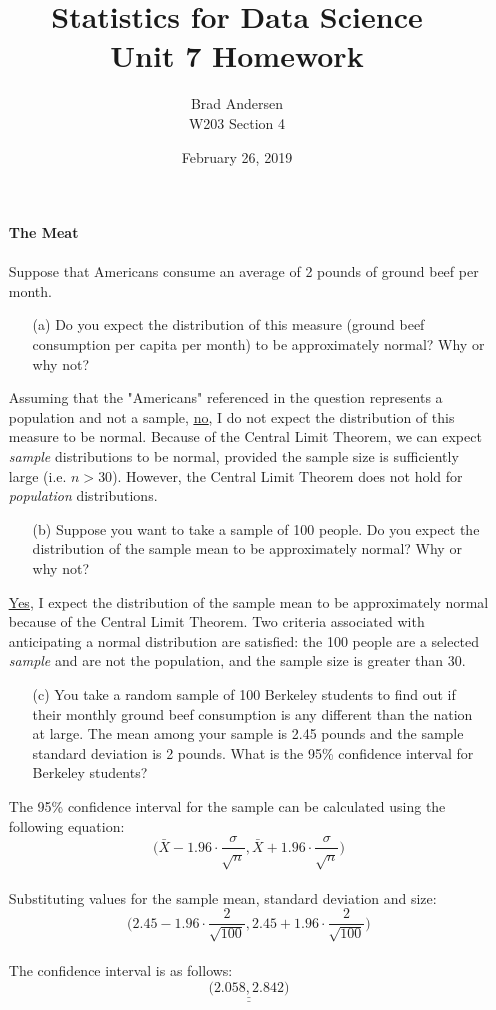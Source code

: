 \documentclass[12pt,a4paper]{article}
\title{Statistics for Data Science \\
    Unit 7 Homework}
\author{Brad Andersen \\
    W203 Section 4}
\date{February 26, 2019}
\numberwithin{equation}{subsection}
\def\doubleunderline#1{\underline{\underline{#1}}}
\begin{document}
\maketitle

\begin{enumerate}

\item[]\textbf{The Meat} \\ \\
Suppose that Americans consume an average of 2 pounds of ground beef per month.
\begin{enumerate}
\item[(a)]
Do you expect the distribution of this measure (ground beef consumption per capita per month) to be approximately normal? Why or why not?
\end{enumerate}
Assuming that the "Americans" referenced in the question represents a population and not a sample, \doubleunderline{no}, I do not expect the distribution of this measure to be normal.  Because of the Central Limit Theorem, we can expect \textit{sample} distributions to be normal, provided the sample size is sufficiently large (i.e. $n > 30$).  However, the Central Limit Theorem does not hold for \textit{population} distributions.
\begin{enumerate}
\item[(b)]
Suppose you want to take a sample of 100 people. Do you expect the distribution of the sample mean to be approximately normal? Why or why not?
\end{enumerate}
\doubleunderline{Yes}, I expect the distribution of the sample mean to be approximately normal because of the Central Limit Theorem.  Two criteria associated with anticipating a normal distribution are satisfied: the 100 people are a selected \textit{sample} and are not the population, and the sample size is greater than 30.
\begin{enumerate}
\item[(c)]
You take a random sample of 100 Berkeley students to find out if their monthly ground beef consumption is any different than the nation at large.  The mean among your sample is 2.45 pounds and the sample standard deviation is 2 pounds. What is the 95\% confidence interval for Berkeley students?
\end{enumerate}
The 95\% confidence interval for the sample can be calculated using the following equation: \\
$$ \big( \bar{X} -1.96 \cdot \frac{\sigma}{\sqrt{n}}, \bar{X} +1.96 \cdot \frac{\sigma}{\sqrt{n}} \big) $$ \\
Substituting values for the sample mean, standard deviation and size:
$$ \big( 2.45 -1.96 \cdot \frac{2}{\sqrt{100}}, 2.45 +1.96 \cdot \frac{2}{\sqrt{100}} \big) $$ \\
The confidence interval is as follows: \\
$$ \doubleunderline{\big( 2.058, 2.842 \big)} $$


\end{enumerate}
\end{document}
